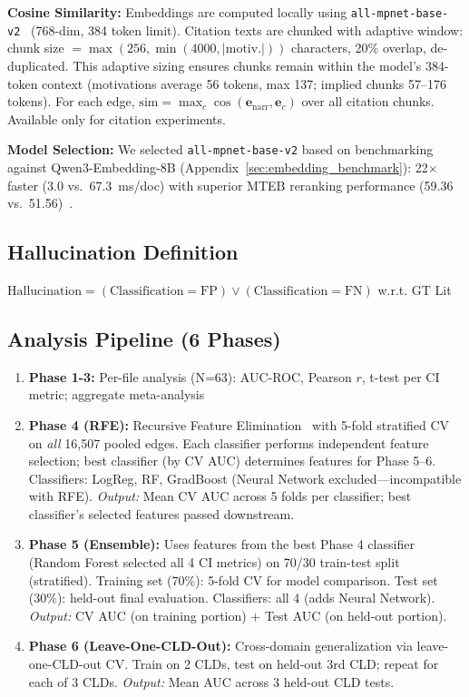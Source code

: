\textbf{Cosine Similarity:} Embeddings are computed locally using \texttt{all-mpnet-base-v2}~\cite{reimers2019sentencebert} (768-dim, 384 token limit). Citation texts are chunked with adaptive window: chunk size $= \max(256, \min(4000, |\text{motiv.}|))$ characters, 20\% overlap, de-duplicated. This adaptive sizing ensures chunks remain within the model's 384-token context (motivations average 56 tokens, max 137; implied chunks 57--176 tokens). For each edge, $\text{sim} = \max_c \cos(\mathbf{e}_{\text{narr}}, \mathbf{e}_c)$ over all citation chunks. Available only for citation experiments.

\textbf{Model Selection:} We selected \texttt{all-mpnet-base-v2} based on benchmarking against Qwen3-Embedding-8B (Appendix~\ref{sec:embedding_benchmark}): 22$\times$ faster (3.0 vs.\ 67.3~ms/doc) with superior MTEB reranking performance (59.36 vs.\ 51.56)~\cite{muennighoff2023mteb}.

\subsection{Hallucination Definition}
$\text{Hallucination} = (\text{Classification} = \text{FP}) \lor (\text{Classification} = \text{FN})$ w.r.t. GT Lit

\subsection{Analysis Pipeline (6 Phases)}
\begin{enumerate}[noitemsep]
    \item \textbf{Phase 1-3:} Per-file analysis (N=63): AUC-ROC, Pearson $r$, t-test per CI metric; aggregate meta-analysis
    \item \textbf{Phase 4 (RFE):} Recursive Feature Elimination~\cite{pedregosa2011sklearn} with 5-fold stratified CV on \textit{all} 16,507 pooled edges. Each classifier performs independent feature selection; best classifier (by CV AUC) determines features for Phase 5--6. Classifiers: LogReg, RF, GradBoost (Neural Network excluded---incompatible with RFE). \textit{Output:} Mean CV AUC across 5 folds per classifier; best classifier's selected features passed downstream.
    \item \textbf{Phase 5 (Ensemble):} Uses features from the best Phase 4 classifier (Random Forest selected all 4 CI metrics) on 70/30 train-test split (stratified). Training set (70\%): 5-fold CV for model comparison. Test set (30\%): held-out final evaluation. Classifiers: all 4 (adds Neural Network). \textit{Output:} CV AUC (on training portion) + Test AUC (on held-out portion).
    \item \textbf{Phase 6 (Leave-One-CLD-Out):} Cross-domain generalization via leave-one-CLD-out CV. Train on 2 CLDs, test on held-out 3rd CLD; repeat for each of 3 CLDs. \textit{Output:} Mean AUC across 3 held-out CLD tests.
\end{enumerate}

